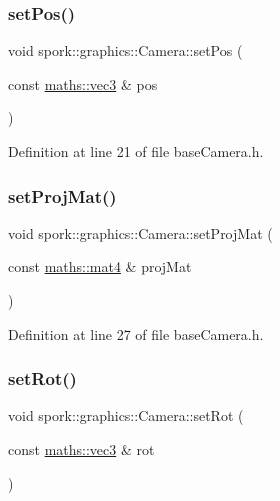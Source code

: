 \subsubsection{\texorpdfstring{set\+Pos()}{setPos()}}
{\footnotesize\ttfamily void spork\+::graphics\+::\+Camera\+::set\+Pos (\begin{DoxyParamCaption}\item[{const \hyperlink{structspork_1_1maths_1_1vec3}{maths\+::vec3} \&}]{pos }\end{DoxyParamCaption})\hspace{0.3cm}{\ttfamily [inline]}}



Definition at line 21 of file base\+Camera.\+h.

\mbox{\label{classspork_1_1graphics_1_1_camera_a51edc9ff1d5e1dd15da08273e71fa00a}} 
\subsubsection{\texorpdfstring{set\+Proj\+Mat()}{setProjMat()}}
{\footnotesize\ttfamily void spork\+::graphics\+::\+Camera\+::set\+Proj\+Mat (\begin{DoxyParamCaption}\item[{const \hyperlink{structspork_1_1maths_1_1mat4}{maths\+::mat4} \&}]{proj\+Mat }\end{DoxyParamCaption})\hspace{0.3cm}{\ttfamily [inline]}}



Definition at line 27 of file base\+Camera.\+h.

\mbox{\label{classspork_1_1graphics_1_1_camera_aefaec9421f08eb10103b5feeb345b959}} 
\subsubsection{\texorpdfstring{set\+Rot()}{setRot()}}
{\footnotesize\ttfamily void spork\+::graphics\+::\+Camera\+::set\+Rot (\begin{DoxyParamCaption}\item[{const \hyperlink{structspork_1_1maths_1_1vec3}{maths\+::vec3} \&}]{rot }\end{DoxyParamCaption})\hspace{0.3cm}{\ttfamily [inline]}}



